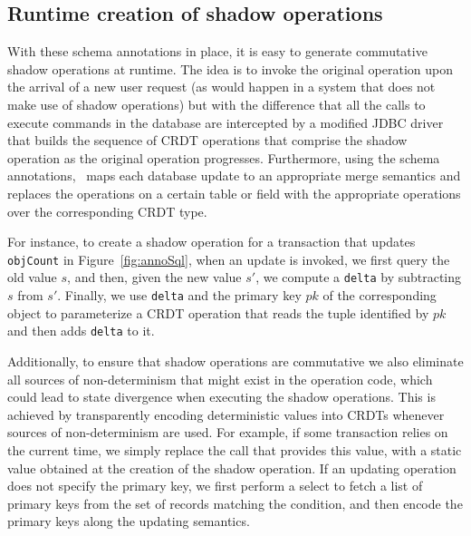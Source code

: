 \subsection{Runtime creation of shadow operations}

With these schema annotations in place, it is easy to generate
commutative shadow operations at runtime. The idea is to invoke the
original operation upon the arrival of a new user request (as would
happen in a system that does not make use of shadow operations) but
with the difference that all the calls to execute commands in the
database are intercepted by a modified JDBC driver that builds the
sequence of CRDT operations that comprise the shadow operation as the
original operation progresses. Furthermore, using the schema
annotations, \tool\ maps each database update to an
appropriate merge semantics and replaces the operations on a certain table or field
with the appropriate operations over the corresponding CRDT type.

For instance, to create a shadow operation for a transaction that
updates \texttt{objCount} in Figure~\ref{fig:annoSql},
when an update is invoked, we first query the old value $s$,
and then, given  the new value
$s'$, we compute a \texttt{delta} by subtracting $s$ from
$s'$. Finally, we use \texttt{delta} and the primary key $pk$ of
the corresponding object to parameterize
a CRDT operation that reads the tuple
identified by $pk$ and then adds \texttt{delta} to it.



Additionally, to ensure that shadow operations are commutative we also eliminate all sources
of non-determinism that might exist in the operation code, which could lead to state divergence
when executing the shadow operations. This is achieved by transparently encoding deterministic
values into CRDTs whenever sources of non-determinism are used. For example, if some transaction relies
on the current time, we simply replace the call that provides this value, with a static value obtained
at the creation of the shadow operation. If an updating operation does not specify the primary key, 
we first perform a select to fetch a list of primary keys from the set of records matching the
condition, and then encode the primary keys along the updating semantics.
\fi

